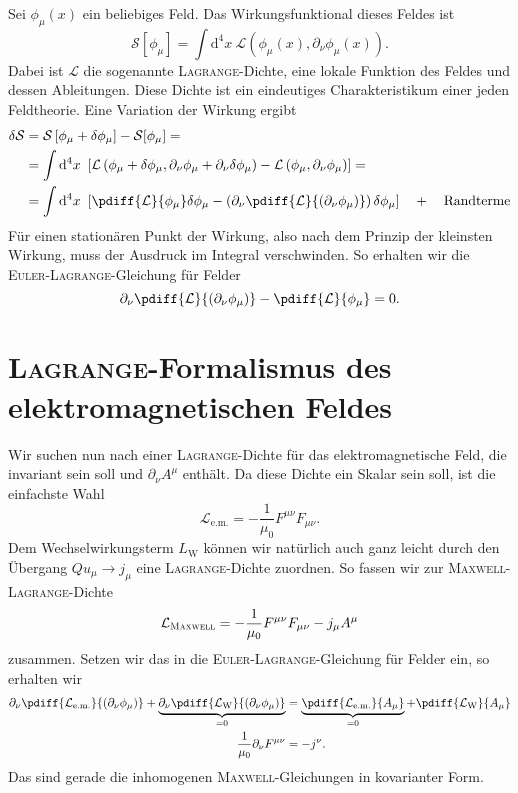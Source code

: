 Sei $\phi_\mu(x)$ ein beliebiges Feld. Das Wirkungsfunktional dieses Feldes ist
\begin{equation*}
\mathcal{S}[\phi_\mu]=\int\mathrm{d}^4x\ \mathcal{L}\left(\phi_\mu(x),\partial_\nu \phi_\mu(x)\right).
\end{equation*}
Dabei ist $\mathcal{L}$ die sogenannte \textsc{Lagrange}-Dichte, eine lokale Funktion des Feldes und dessen Ableitungen. Diese Dichte ist ein eindeutiges Charakteristikum einer jeden Feldtheorie. Eine Variation der Wirkung ergibt
\begin{align*}
\delta \mathcal{S} &= \mathcal{S}\left[\phi_\mu+\delta\phi_\mu\right]-\mathcal{S}[\phi_\mu]  = \\
&=\int\mathrm{d}^4 x\ \left[\mathcal{L}\left(\phi_\mu+\delta\phi_\mu,\partial_\nu\phi_\mu+\partial_\nu\delta\phi_\mu\right)-\mathcal{L}\left(\phi_\mu,\partial_\nu\phi_\mu \right)\right] =
\\ 
&= \int\mathrm{d}^4 x\ \left[\pdiff{\mathcal{L}}{\phi_\mu}\delta\phi_\mu -\left(\partial_\nu\pdiff{\mathcal{L}}{(\partial_\nu\phi_\mu)}\right)\delta\phi_\mu\right] \quad+ \quad\text{Randterme}
\end{align*}
Für einen stationären Punkt der Wirkung, also nach dem Prinzip der kleinsten Wirkung, muss der Ausdruck im Integral verschwinden. So erhalten wir die \textsc{Euler-Lagrange}-Gleichung für Felder
\begin{equation*}
\partial_\nu\pdiff{\mathcal{L}}{(\partial_\nu\phi_\mu)} - \pdiff{\mathcal{L}}{\phi_\mu}= 0.
\end{equation*}  

\section{\textsc{Lagrange}-Formalismus des elektromagnetischen Feldes}

Wir suchen nun nach einer \textsc{Lagrange}-Dichte für das elektromagnetische Feld, die invariant sein soll und $\partial_\nu A^\mu$ enthält. Da diese Dichte ein Skalar sein soll, ist die einfachste Wahl
\begin{equation*}
\mathcal{L}_\text{e.m.}=-\frac{1}{\mu_0}F^{\mu\nu}F_{\mu\nu}.
\end{equation*}
Dem Wechselwirkungsterm $L_\text{W}$ können wir natürlich auch ganz leicht durch den Übergang $Qu_\mu\rightarrow j_\mu$ eine \textsc{Lagrange}-Dichte zuordnen. So fassen wir zur \textsc{Maxwell-Lagrange}-Dichte 
\begin{equation*}
\mathcal{L}_\textsc{Maxwell} = -\frac{1}{\mu_0}F^{\mu\nu}F_{\mu\nu} - j_\mu A^\mu
\end{equation*}  
zusammen. Setzen wir das in die \textsc{Euler-Lagrange}-Gleichung für Felder ein, so erhalten wir
\begin{align*}
\partial_\nu\pdiff{\mathcal{L}_\text{e.m.}}{(\partial_\nu\phi_\mu)} + \underbrace{\partial_\nu\pdiff{\mathcal{L}_\text{W}}{(\partial_\nu\phi_\mu)}}_{=0} &= \underbrace{\pdiff{\mathcal{L}_\text{e.m.}}{A_\mu}}_{=0} + \pdiff{\mathcal{L}_\text{W}}{A_\mu}\\
\frac{1}{\mu_0}\partial_\nu F^{\mu\nu} &= -j^\nu.
\end{align*}
Das sind gerade die inhomogenen \textsc{Maxwell}-Gleichungen in kovarianter Form. 